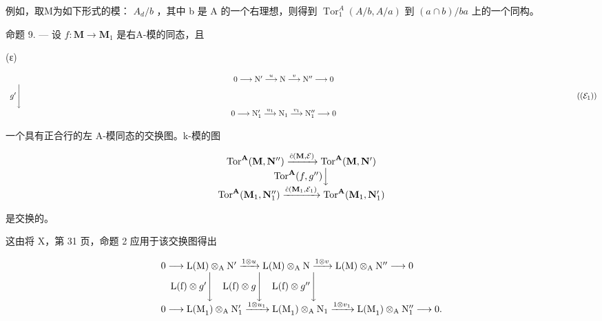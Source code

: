 例如，取M为如下形式的模： \(A_{d}/b\) ，其中 b 是 A 的一个右理想，则得到 \(\operatorname{Tor}_{1}^{A}(A/b, A/a)\) 到 \((a \cap b)/ba\) 上的一个同构。

命题 9. --- 设 \(f: \mathbf{M} \to \mathbf{M}_{1}\) 是右A-模的同态，且

(ε)

\[
\begin{array}{c} 0 \longrightarrow \mathrm{N} ^ {\prime} \stackrel {{u}} {{\longrightarrow}} \mathrm{N} \stackrel {{v}} {{\longrightarrow}} \mathrm{N} ^ {\prime \prime} \longrightarrow 0 \\ g ^ {\prime} \Biggl \downarrow \qquad \qquad \qquad \qquad \qquad \qquad \qquad \qquad \qquad \qquad \qquad \qquad \qquad \qquad \qquad \qquad \qquad \qquad \qquad \qquad \qquad \qquad \qquad \qquad \qquad \qquad \qquad \qquad \qquad \qquad \qquad \qquad \qquad \qquad \\ 0 \longrightarrow \mathrm{N} _ {1} ^ {\prime} \stackrel {{u _ {1}}} {{\longrightarrow}} \mathrm{N} _ {1} \stackrel {{v _ {1}}} {{\longrightarrow}} \mathrm{N} _ {1} ^ {\prime \prime} \longrightarrow 0 \end{array}\tag{$(\mathcal{E}_1)$}
\]

一个具有正合行的左 A-模同态的交换图。k-模的图

\[
\begin{array}{c} \operatorname{Tor} ^ {\mathbf {A}} (\mathbf {M}, \mathbf {N} ^ {\prime \prime}) \xrightarrow {\hat {c} (\mathbf {M} , \mathcal {E})} \operatorname{Tor} ^ {\mathbf {A}} (\mathbf {M}, \mathbf {N} ^ {\prime}) \\ \operatorname{Tor} ^ {\mathbf {A}} (f, g ^ {\prime \prime}) \Big \downarrow \\ \operatorname{Tor} ^ {\mathbf {A}} (\mathbf {M} _ {1}, \mathbf {N} _ {1} ^ {\prime \prime}) \xrightarrow {\hat {c} (\mathbf {M} _ {1} , \mathcal {E} _ {1})} \operatorname{Tor} ^ {\mathbf {A}} (\mathbf {M} _ {1}, \mathbf {N} _ {1} ^ {\prime}) \end{array}
\]

是交换的。

这由将 X，第 31 页，命题 2 应用于该交换图得出

\[
\begin{array}{l} 0 \longrightarrow \mathrm{L(M)} \otimes_ {\mathrm{A}} \mathrm{N} ^ {\prime} \xrightarrow {1 \otimes u} \mathrm{L(M)} \otimes_ {\mathrm{A}} \mathrm{N} \xrightarrow {1 \otimes v} \mathrm{L(M)} \otimes_ {\mathrm{A}} \mathrm{N} ^ {\prime \prime} \longrightarrow 0 \\ \quad \mathrm{L(f)} \otimes g ^ {\prime} \Biggl \downarrow \quad \mathrm{L(f)} \otimes g \Biggl \downarrow \quad \mathrm{L(f)} \otimes g ^ {\prime \prime} \Biggl \downarrow \\ 0 \longrightarrow \mathrm{L(M} _ {1}) \otimes_ {\mathrm{A}} \mathrm{N} _ {1} ^ {\prime} \xrightarrow {1 \otimes u _ {1}} \mathrm{L(M} _ {1}) \otimes_ {\mathrm{A}} \mathrm{N} _ {1} \xrightarrow {1 \otimes v _ {1}} \mathrm{L(M} _ {1}) \otimes_ {\mathrm{A}} \mathrm{N} _ {1} ^ {\prime \prime} \longrightarrow 0. \end{array}
\]

